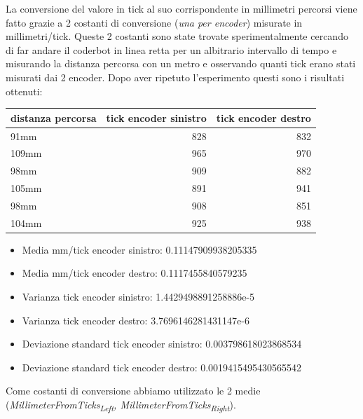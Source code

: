 \documentclass[11pt]{article}
\begin{document}
La conversione del valore in tick al suo corrispondente in millimetri percorsi viene fatto grazie a 2 costanti di conversione (\emph{una per encoder}) misurate in millimetri/tick.
Queste 2 costanti sono state trovate sperimentalmente cercando di far andare il coderbot in linea retta per un albitrario intervallo di tempo e misurando la distanza percorsa con un metro e osservando quanti tick erano stati misurati dai 2 encoder. Dopo aver ripetuto l'esperimento questi sono i risultati ottenuti:
\begin{center}
\begin{tabular}{lrr}
distanza percorsa & tick encoder sinistro & tick encoder destro\\
\hline
91mm & 828 & 832\\
109mm & 965 & 970\\
98mm & 909 & 882\\
105mm & 891 & 941\\
98mm & 908 & 851\\
104mm & 925 & 938\\
\end{tabular}
\end{center}
\begin{itemize}
\item Media mm/tick encoder sinistro:            0.11147909938205335
\item Media mm/tick encoder destro:              0.1117455840579235
\item Varianza tick encoder sinistro:            1.4429498891258886e-5
\item Varianza tick encoder destro:              3.7696146281431147e-6
\item Deviazione standard tick encoder sinistro: 0.003798618023868534
\item Deviazione standard tick encoder destro:   0.0019415495430565542
\end{itemize}

Come costanti di conversione abbiamo utilizzato le 2 medie (\emph{MillimeterFromTicks\textsubscript{Left}, MillimeterFromTicks\textsubscript{Right}}).
\end{document}
